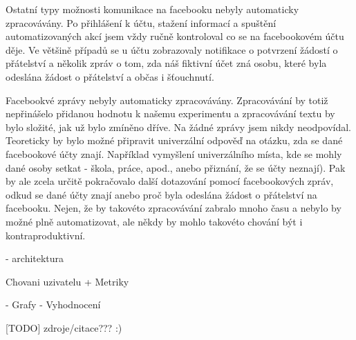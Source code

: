 \documentclass[thesis=M,czech]{FITthesis}[2013/05/10]
\begin{document}
Ostatní typy možnosti komunikace na facebooku nebyly automaticky zpracovávány. Po přihlášení k účtu, stažení informací a spuštění automatizovaných akcí jsem vždy ručně kontroloval co se na facebookovém účtu děje. Ve většině případů se u účtu zobrazovaly notifikace o potvrzení žádostí o přátelství a několik zpráv o tom, zda náš fiktivní účet zná osobu, které byla odeslána žádost o přátelství a občas i šťouchnutí.

Facebookvé zprávy nebyly automaticky zpracovávány. Zpracovávání by totiž nepřinášelo přidanou hodnotu k našemu experimentu a zpracovávání textu by bylo složité, jak už bylo zmíněno dříve. Na žádné zprávy jsem nikdy neodpovídal. Teoreticky by bylo možné připravit univerzální odpověď na otázku, zda se dané facebookové účty znají. Například vymyšlení univerzálního místa, kde se mohly dané osoby setkat - škola, práce, apod., anebo přiznání, že se účty neznají). Pak by ale zcela určitě pokračovalo další dotazování pomocí facebookových zpráv, odkud se dané účty znají anebo proč byla odeslána žádost o přátelství na facebooku. Nejen, že by takovéto zpracovávání zabralo mnoho času a nebylo by možné plně automatizovat, ale někdy by mohlo takovéto chování být i kontraproduktivní.



- architektura

Chovani uzivatelu + Metriky

\begin{conclusion}

- Grafy
- Vyhodnocení

\end{conclusion}

[TODO] zdroje/citace??? :)



\appendix
\end{document}
